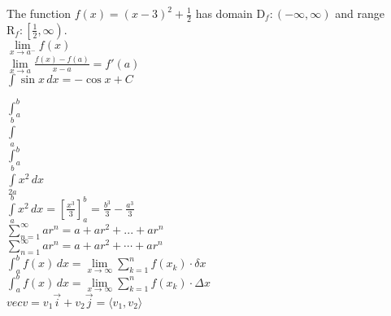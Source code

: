 \documentclass[11pt]{article}
\begin{document}
The function $f(x)=(x-3)^2+\frac{1}{2}$ has domain $\mathrm{D}_f:(-\infty,\infty)$
and range $\mathrm{R}_f:\left[\frac{1}{2},\infty\right)$.\\

$\lim \limits_{x \to a^-}f(x)$\\

$\displaystyle{\lim \limits_{x \to a} \frac{f(x)-f(a)}{x-a}=f'(a)}$\\

$\displaystyle{\int \sin x \,dx=-\cos x+C}$

$\int_a^b$\\

$\int \limits_a^b$\\

$\displaystyle{\int_a^b}$\\

$\displaystyle{\int \limits_{2a}^{b}x^2 \,dx}$\\

$\displaystyle{\int \limits_{a}^{b}x^2 \,dx=\left[\frac{x^3}{3}\right]_{a}^{b}=\frac{b^3}{3}-\frac{a^3}{3}}$\\

$\displaystyle{\sum \limits_{n=1}^{\infty}ar^n=a+ar^2+...+ar^n}$\\

$\displaystyle{\sum \limits_{n=1}^{\infty}ar^n=a+ar^2+\cdots+ar^n}$\\

$\displaystyle{\int_a^b f(x) \,dx=\lim \limits_{x \to \infty} \sum \limits_{k=1}^{n} f(x_k) \cdot \delta x}$\\

$\displaystyle{\int_a^b f(x) \,dx=\lim \limits_{x \to \infty} \sum \limits_{k=1}^{n} f(x_k) \cdot \Delta x}$\\

$vec{v}=v_1 \vec{i}+v_2 \vec{j}=\langle v_1,v_2 \rangle$
\end{document}
